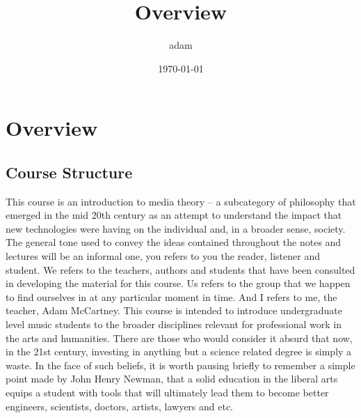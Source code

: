\documentclass[11pt]{article}
\author{adam}
\date{\today}
\title{Overview}
\begin{document}
\maketitle
\section*{Overview}
\label{sec:org5e063fc}

\subsection*{Course Structure}
\label{sec:org60c0843}
This course is an introduction to media theory – a subcategory of
philosophy that emerged in the mid 20th century as an attempt to
understand the impact that new technologies were having on the
individual and, in a broader sense, society.
The general tone used to convey the ideas contained throughout the
notes and lectures will be an informal one, you refers to you the
reader, listener and student. We refers to the teachers, authors and
students that have been consulted in developing the material for this
course. Us refers to the group that we happen to find ourselves in at
any particular moment in time. And I refers to me, the teacher, Adam McCartney.
This course is intended to introduce undergraduate level music
students to the broader disciplines relevant for professional work in
the arts and humanities. There are those who would consider it absurd
that now, in the 21st century, investing in anything but a science
related degree is simply a waste. In the face of such beliefs, it is
worth pausing briefly to remember a simple point made by John Henry
Newman, that a solid education in the liberal arts equips a student
with tools that will ultimately lead them to become better engineers,
scientists, doctors, artists, lawyers and etc.
\end{document}
